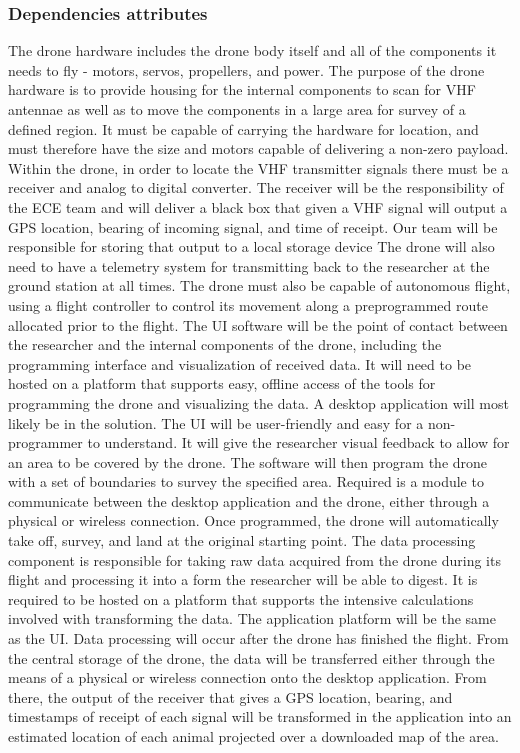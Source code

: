 \documentclass[onecolumn, draftclsnofoot,10pt, compsoc]{IEEEtran}
\begin{document}
\subsubsection{Dependencies attributes}

The drone hardware includes the drone body itself and all of the components it needs to fly - motors, servos, propellers, and power.
The purpose of the drone hardware is to provide housing for the internal components to scan for VHF antennae as well as to move the components in a large area for survey of a defined region.
It must be capable of carrying the hardware for location, and must therefore have the size and motors capable of delivering a non-zero payload.
Within the drone, in order to locate the VHF transmitter signals there must be a receiver and analog to digital converter.
The receiver will be the responsibility of the ECE team and will deliver a black box that given a VHF signal will output a GPS location, bearing of incoming signal, and time of receipt.
Our team will be responsible for storing that output to a local storage device
The drone will also need to have a telemetry system for transmitting back to the researcher at the ground station at all times.
The drone must also be capable of autonomous flight, using a flight controller to control its movement along a preprogrammed route allocated prior to the flight.
\newline
\newline
The UI software will be the point of contact between the researcher and the internal components of the drone, including the programming interface and visualization of received data.
It will need to be hosted on a platform that supports easy, offline access of the tools for programming the drone and visualizing the data.
A desktop application will most likely be in the solution.
The UI will be user-friendly and easy for a non-programmer to understand.
It will give the researcher visual feedback to allow for an area to be covered by the drone.
The software will then program the drone with a set of boundaries to survey the specified area.
Required is a module to communicate between the desktop application and the drone, either through a physical or wireless connection.
Once programmed, the drone will automatically take off, survey, and land at the original starting point.
\newline
\newline
The data processing component is responsible for taking raw data acquired from the drone during its flight and processing it into a form the researcher will be able to digest.
It is required to be hosted on a platform that supports the intensive calculations involved with transforming the data.
The application platform will be the same as the UI.
Data processing will occur after the drone has finished the flight.
From the central storage of the drone, the data will be transferred either through the means of a physical or wireless connection onto the desktop application.
From there, the output of the receiver that gives a GPS location, bearing, and timestamps of receipt of each signal will be transformed in the application into an estimated location of each animal projected over a downloaded map of the area.
\newline
\newline
\end{document}
